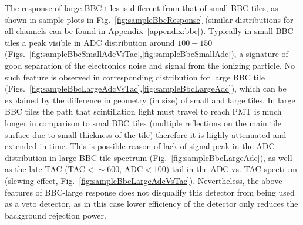 The response of large BBC tiles is different from that of small BBC tiles, as shown in sample plots in Fig.~\ref{fig:sampleBbcResponse} (similar distributions for all channels can be found in Appendix~\ref{appendix:bbc}). Typically in small BBC tiles a peak visible in ADC distribution around $100-150$ (Figs.~\ref{fig:sampleBbcSmallAdcVsTac},\ref{fig:sampleBbcSmallAdc}), a signature of good separation of the electronics noise and signal from the ionizing particle. No such feature is observed in corresponding distribution for large BBC tile (Figs.~\ref{fig:sampleBbcLargeAdcVsTac},\ref{fig:sampleBbcLargeAdc}), which can be explained by the difference in geometry (in size) of small and large tiles. In large BBC tiles the path that scintillation light must travel to reach PMT is much longer in comparison to smal BBC tiles (multiple reflections on the main tile surface due to small thickness of the tile) therefore it is highly attenuated and extended in time. This is possible reason of lack of signal peak in the ADC distribution in large BBC tile spectrum (Fig.~\ref{fig:sampleBbcLargeAdc}), as well as the late-TAC (TAC$<\sim600$, ADC$<100$) tail in the ADC vs. TAC spectrum (slewing effect, Fig.~\ref{fig:sampleBbcLargeAdcVsTac}). Nevertheless, the above features of BBC-large response does not disqualify this detector from being used as a veto detector, as in this case lower efficiency of the detector only reduces the background rejection power.


